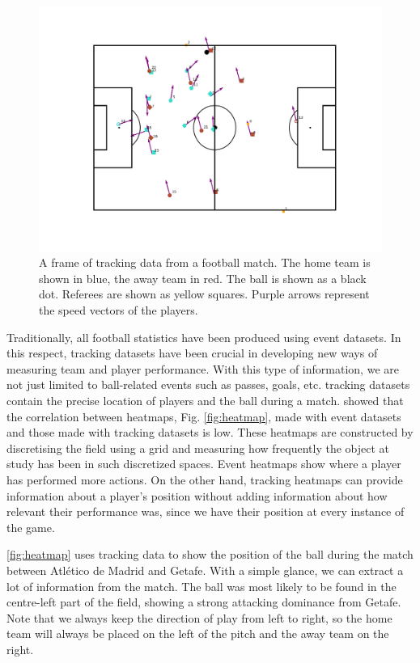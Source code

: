 \documentclass[
  10pt,
  twoside,nohyper]{book}
\begin{document}
\begin{figure}[H]

{\centering \includegraphics[width=0.8\linewidth,]{imagenes/Frame} 

}

\caption{A frame of tracking data from a football match. The home team is shown in blue, the away team in red. The ball is shown as a black dot. Referees are shown as yellow squares. Purple arrows represent the speed vectors of the players.}\label{fig:frame}
\end{figure}

Traditionally, all football statistics have been produced using event datasets. In this respect, tracking datasets have been crucial in developing new ways of measuring team and player performance. With this type of information, we are not just limited to ball-related events such as passes, goals, etc. tracking datasets contain the precise location of players and the ball during a match. \autocite{GARRIDO2022112827} showed that the correlation between heatmaps, Fig. \ref{fig:heatmap}, made with event datasets and those made with tracking datasets is low. These heatmaps are constructed by discretising the field using a grid and measuring how frequently the object at study has been in such discretized spaces. Event heatmaps show where a player has performed more actions. On the other hand, tracking heatmaps can provide information about a player's position without adding information about how relevant their performance was, since we have their position at every instance of the game.

\ref{fig:heatmap} uses tracking data to show the position of the ball during the match between Atlético de Madrid and Getafe. With a simple glance, we can extract a lot of information from the match. The ball was most likely to be found in the centre-left part of the field, showing a strong attacking dominance from Getafe. Note that we always keep the direction of play from left to right, so the home team will always be placed on the left of the pitch and the away team on the right.
\end{document}
